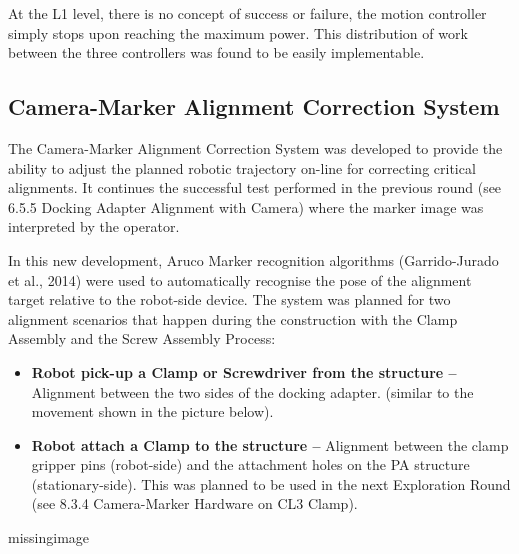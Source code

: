 At the L1 level, there is no concept of success or failure, the motion controller simply stops upon reaching the maximum power. This distribution of work between the three controllers was found to be easily implementable.

\subsection{Camera-Marker Alignment Correction System}
The Camera-Marker Alignment Correction System was developed to provide the ability to adjust the planned robotic trajectory on-line for correcting critical alignments. It continues the successful test performed in the previous round (see 6.5.5 Docking Adapter Alignment with Camera) where the marker image was interpreted by the operator. 

In this new development, Aruco Marker recognition algorithms (Garrido-Jurado et al., 2014) were used to automatically recognise the pose of the alignment target relative to the robot-side device. The system was planned for two alignment scenarios that happen during the construction with the Clamp Assembly and the Screw Assembly Process:

\begin{itemize}
    \item \textbf{Robot pick-up a Clamp or Screwdriver from the structure --} Alignment between the two sides of the docking adapter. (similar to the movement shown in the picture below).
    \item \textbf{Robot attach a Clamp to the structure --} Alignment between the clamp gripper pins (robot-side) and the attachment holes on the PA structure (stationary-side). This was planned to be used in the next Exploration Round (see 8.3.4 Camera-Marker Hardware on CL3 Clamp).
\end{itemize}

missingimage

